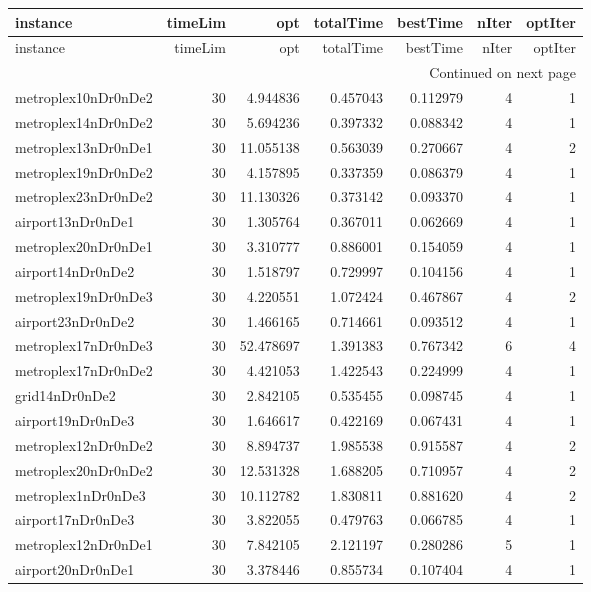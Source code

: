 \documentclass[../../../thesis.tex]{subfiles}
\begin{document}
\tiny
\begin{longtable}{|l|r|r|r|r|r|r|}
\toprule
instance & timeLim & opt & totalTime & bestTime & nIter & optIter \\
\midrule
\endfirsthead
\toprule
instance & timeLim & opt & totalTime & bestTime & nIter & optIter \\
\midrule
\endhead
\midrule
\multicolumn{7}{r}{Continued on next page} \\
\midrule
\endfoot
\bottomrule
\endlastfoot
metroplex10nDr0nDe2 & 30 & 4.944836 & 0.457043 & 0.112979 & 4 & 1 \\
metroplex14nDr0nDe2 & 30 & 5.694236 & 0.397332 & 0.088342 & 4 & 1 \\
metroplex13nDr0nDe1 & 30 & 11.055138 & 0.563039 & 0.270667 & 4 & 2 \\
metroplex19nDr0nDe2 & 30 & 4.157895 & 0.337359 & 0.086379 & 4 & 1 \\
metroplex23nDr0nDe2 & 30 & 11.130326 & 0.373142 & 0.093370 & 4 & 1 \\
airport13nDr0nDe1 & 30 & 1.305764 & 0.367011 & 0.062669 & 4 & 1 \\
metroplex20nDr0nDe1 & 30 & 3.310777 & 0.886001 & 0.154059 & 4 & 1 \\
airport14nDr0nDe2 & 30 & 1.518797 & 0.729997 & 0.104156 & 4 & 1 \\
metroplex19nDr0nDe3 & 30 & 4.220551 & 1.072424 & 0.467867 & 4 & 2 \\
airport23nDr0nDe2 & 30 & 1.466165 & 0.714661 & 0.093512 & 4 & 1 \\
metroplex17nDr0nDe3 & 30 & 52.478697 & 1.391383 & 0.767342 & 6 & 4 \\
metroplex17nDr0nDe2 & 30 & 4.421053 & 1.422543 & 0.224999 & 4 & 1 \\
grid14nDr0nDe2 & 30 & 2.842105 & 0.535455 & 0.098745 & 4 & 1 \\
airport19nDr0nDe3 & 30 & 1.646617 & 0.422169 & 0.067431 & 4 & 1 \\
metroplex12nDr0nDe2 & 30 & 8.894737 & 1.985538 & 0.915587 & 4 & 2 \\
metroplex20nDr0nDe2 & 30 & 12.531328 & 1.688205 & 0.710957 & 4 & 2 \\
metroplex1nDr0nDe3 & 30 & 10.112782 & 1.830811 & 0.881620 & 4 & 2 \\
airport17nDr0nDe3 & 30 & 3.822055 & 0.479763 & 0.066785 & 4 & 1 \\
metroplex12nDr0nDe1 & 30 & 7.842105 & 2.121197 & 0.280286 & 5 & 1 \\
airport20nDr0nDe1 & 30 & 3.378446 & 0.855734 & 0.107404 & 4 & 1 \\

\end{longtable}
\end{document}
